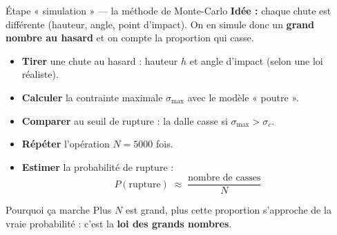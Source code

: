 \documentclass[11pt,aspectratio=169]{beamer}
\begin{document}
\begin{frame}{Étape « simulation » --- la méthode de Monte-Carlo}
  \textbf{Idée :} chaque chute est différente (hauteur, angle, point d'impact).
  On en simule donc un \textbf{grand nombre au hasard} et on compte la proportion
  qui casse.
  \vspace{0.35cm}
  \begin{itemize}
    \item[\textcolor{verre}{\textbf{1.}}] \textbf{Tirer} une chute au hasard :
          hauteur $h$ et angle d'impact (selon une loi réaliste).
    \item[\textcolor{verre}{\textbf{2.}}] \textbf{Calculer} la contrainte maximale
          $\sigma_{\max}$ avec le modèle « poutre ».
    \item[\textcolor{verre}{\textbf{3.}}] \textbf{Comparer} au seuil de rupture :
          la dalle casse si $\sigma_{\max} > \sigma_c$.
    \item[\textcolor{verre}{\textbf{4.}}] \textbf{Répéter} l'opération $N=5000$ fois.
    \item[\textcolor{verre}{\textbf{5.}}] \textbf{Estimer} la probabilité de rupture :
      \[ P(\text{rupture}) \;\approx\; \frac{\text{nombre de casses}}{N} \]
  \end{itemize}
  \vspace{0.15cm}
  \begin{block}{Pourquoi ça marche}
  \footnotesize Plus $N$ est grand, plus cette proportion s'approche de la vraie
  probabilité : c'est la \textbf{loi des grands nombres}.
  \end{block}
\end{frame}
\end{document}
